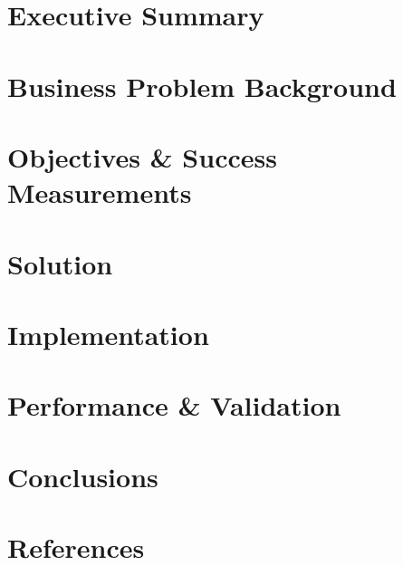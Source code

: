 \documentclass[12pt, a4paper]{report}
\begin{document}

\restoregeometry

\setcounter{tocdepth}{5}
\tableofcontents




\justify

\chapter*{Executive Summary}

\clearpage

\chapter{Business Problem Background}

\clearpage

\chapter{Objectives \& Success Measurements}

\clearpage

\chapter{Solution} %

\clearpage

\chapter{Implementation} %

\clearpage

\chapter{Performance \& Validation} %

\clearpage

\chapter{Conclusions} %

\clearpage


\chapter{References}
\label{cha:ref}
\printbibliography[heading=none]

\clearpage

\begin{appendices}
  
\end{appendices}
\end{document}

